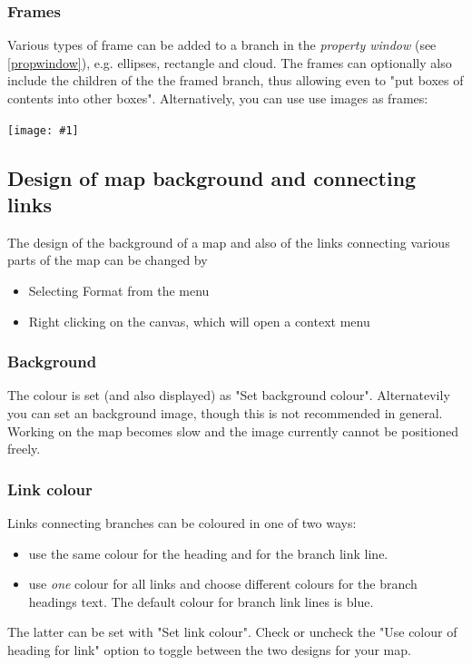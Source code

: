 \documentclass[12pt,a4paper]{article}
\newcommand{\maximage}[1]{  
    \begin{center}
        \texttt{[image: \#1]} 
    \end{center}
}
\begin{document}
\subsubsection*{Frames}
Various types of frame can be added to a branch in the {\em property window} (see
\ref{propwindow}), e.g. ellipses, rectangle and cloud. The frames can
optionally also include the children of the the framed branch, thus
allowing even to "put boxes of contents into other boxes".
Alternatively, you can use use images as frames: 
\maximage{images/frames.png}

\subsection{Design of map background and connecting links }
The design of the background of a map and also of the links connecting
various parts of the map can be changed by
\begin{itemize}
    \item Selecting Format from the menu
    \item Right clicking on the canvas, which will open a context menu
\end{itemize}

\subsubsection*{Background }
The colour is set (and also displayed) as "Set background colour".
Alternatevily you can set an background image, though this is not
recommended in general. Working on the map becomes slow and the image
currently cannot be positioned freely.

\subsubsection*{Link colour}
Links connecting branches can be coloured in one of two ways:
\begin{itemize}
    \item use the same colour for the heading and for the branch link
    line.
    \item use {\em one} colour for all links and choose different
    colours for the branch headings text. The default colour for branch
    link lines is blue.
\end{itemize}
The latter can be set with "Set link colour". Check or uncheck the "Use
colour of heading for link" option to toggle between the two designs for
your map.
\end{document}
